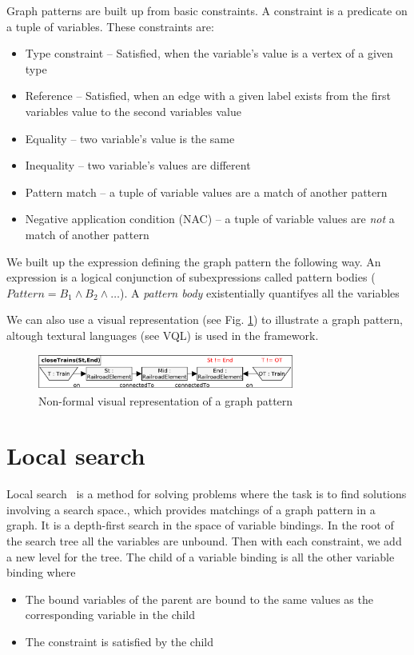 Graph patterns are built up from basic constraints. 
A constraint is a predicate on a tuple of variables. 
These constraints are: 

\begin{itemize}
	\item Type constraint -- Satisfied, when the variable's value is a vertex of a given type
	\item Reference -- Satisfied, when an edge with a given label exists from the first variables value to the second variables value
	\item Equality -- two variable's value is the same
	\item Inequality -- two variable's values are different
	\item Pattern match -- a tuple of variable values are a match of another pattern
	\item Negative application condition (NAC) -- a tuple of variable values are \emph{not} a match of another pattern
\end{itemize}


We built up the expression defining the graph pattern the following way. 
An expression is a logical conjunction of subexpressions called pattern bodies ($Pattern = B_1 \wedge B_2 \wedge \dots$). 
A \emph{pattern body} existentially quantifyes all the variables 


We can also use a visual representation (see Fig. \ref{fig:pattern-visual}) to illustrate a graph pattern, altough textural languages (see VQL) is used in the framework.

\begin{figure}[h]
	\begin{center}
		\includegraphics[width=0.75\textwidth]{figures/pattern-visual.pdf}
		\caption{Non-formal visual representation of a graph pattern}
		\label{fig:pattern-visual}
	\end{center}
\end{figure}


\section{Local search}

Local search~\cite{bur-marton-msc} is a method for solving problems where the task is to find solutions involving a search space., which provides matchings of a graph pattern in a graph. It is a depth-first search in the space of variable bindings. In the root of the search tree all the variables are unbound. Then with each constraint, we add a new level for the tree. The child of a variable binding is all the other variable binding where 
\begin{itemize}
	\item The bound variables of the parent are bound to the same values as the corresponding variable in the child
	\item The constraint is satisfied by the child
\end{itemize}

